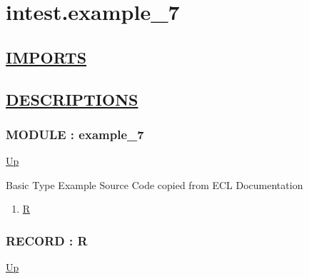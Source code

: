 \chapter*{intest.example\_7}
\hypertarget{ecldoc:toc:intest.example_7}{}

\section*{\underline{IMPORTS}}

\section*{\underline{DESCRIPTIONS}}
\subsection*{MODULE : example\_7}
\hypertarget{ecldoc:intest.example_7}{}
\par
\begin{minipage}[t]{\textwidth}
\begin{flushleft}
  
\end{flushleft}
\end{minipage}
\hyperlink{ecldoc:toc:intest}{Up} \\
\par
Basic Type Example Source Code copied from ECL Documentation \\
\par
\begin{enumerate}
\item \hyperlink{ecldoc:intest.example_7.r}{R}
\end{enumerate}
\subsection*{RECORD : R}
\hypertarget{ecldoc:intest.example_7.r}{}
\par
\begin{minipage}[t]{\textwidth}
\begin{flushleft}
  
\end{flushleft}
\end{minipage}
\hyperlink{ecldoc:intest.example_7}{Up} \\
\par
\par

